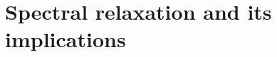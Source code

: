 \documentclass[10pt]{article}
\numberwithin{equation}{section}
\newcommand{\+}{%
	\raisebox{0.18ex}{\scaleobj{0.55}{+}}
}
\theoremstyle{definition}
\begin{document}
\section{Spectral relaxation and its implications}
%


 
\end{document}
